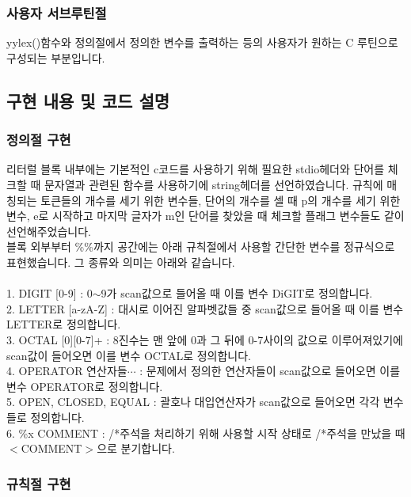 \documentclass{article}
\begin{document}
    \subsubsection{사용자 서브루틴절}
        yylex()함수와 정의절에서 정의한 변수를 출력하는 등의 사용자가 원하는 C 루틴으로 구성되는 부분입니다.\\

\subsection{구현 내용 및 코드 설명}
    \subsubsection{정의절 구현}
        리터럴 블록 내부에는 기본적인 c코드를 사용하기 위해 필요한 stdio헤더와 단어를 체크할 때 문자열과 관련된 함수를 사용하기에 string헤더를 선언하였습니다.
        규칙에 매칭되는 토큰들의 개수를 세기 위한 변수들, 단어의 개수를 셀 때 p의 개수를 세기 위한 변수, e로 시작하고
        마지막 글자가 m인 단어를 찾았을 때 체크할 플래그 변수들도 같이 선언해주었습니다.\\
         블록 외부부터 \%\%까지 공간에는 아래 규칙절에서 사용할 간단한 변수를 정규식으로 표현했습니다.
        그 종류와 의미는 아래와 같습니다. \\\\
        1. DIGIT [0-9] : 0$\sim$9가 scan값으로 들어올 때 이를 변수 DiGIT로 정의합니다.\\
        2. LETTER [a-zA-Z] : 대시로 이어진 알파벳값들 중 scan값으로 들어올 때 이를 변수 LETTER로 정의합니다.\\
        3. OCTAL [0][0-7]+ : 8진수는 맨 앞에 0과 그 뒤에 0-7사이의 값으로 이루어져있기에 scan값이 들어오면 이를 변수 OCTAL로 정의합니다.\\
        4. OPERATOR 연산자들$\cdots$ : 문제에서 정의한 연산자들이 scan값으로 들어오면 이를 변수 OPERATOR로 정의합니다.\\
        5. OPEN, CLOSED, EQUAL : 괄호나 대입연산자가 scan값으로 들어오면 각각 변수들로 정의합니다.\\
        6. \%x COMMENT : /*주석을 처리하기 위해 사용할 시작 상태로 /*주석을 만났을 때 $<$COMMENT$>$으로 분기합니다.
    \subsubsection{규칙절 구현}
\end{document}
